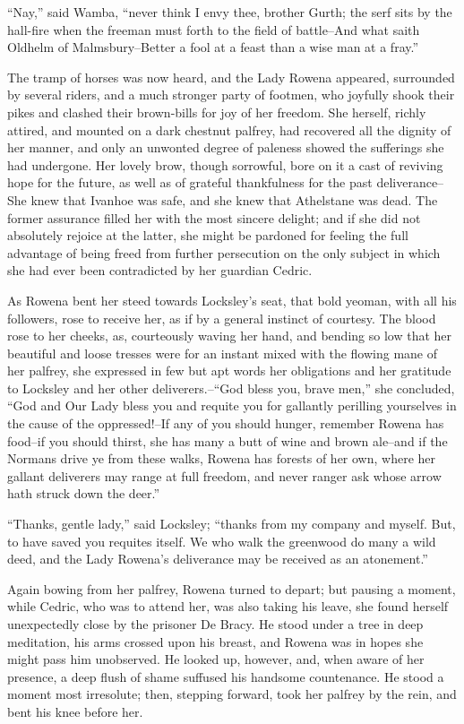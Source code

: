 ``Nay,'' said Wamba, ``never think I envy thee, brother Gurth; the serf
sits by the hall-fire when the freeman must forth to the field of
battle--And what saith Oldhelm of Malmsbury--Better a fool at a feast
than a wise man at a fray.''

The tramp of horses was now heard, and the Lady Rowena appeared,
surrounded by several riders, and a much stronger party of footmen, who
joyfully shook their pikes and clashed their brown-bills for joy of her
freedom. She herself, richly attired, and mounted on a dark chestnut
palfrey, had recovered all the dignity of her manner, and only an
unwonted degree of paleness showed the sufferings she had undergone. Her
lovely brow, though sorrowful, bore on it a cast of reviving hope for
the future, as well as of grateful thankfulness for the past
deliverance--She knew that Ivanhoe was safe, and she knew that
Athelstane was dead. The former assurance filled her with the most
sincere delight; and if she did not absolutely rejoice at the latter,
she might be pardoned for feeling the full advantage of being freed from
further persecution on the only subject in which she had ever been
contradicted by her guardian Cedric.

As Rowena bent her steed towards Locksley's seat, that bold yeoman, with
all his followers, rose to receive her, as if by a general instinct of
courtesy. The blood rose to her cheeks, as, courteously waving her hand,
and bending so low that her beautiful and loose tresses were for an
instant mixed with the flowing mane of her palfrey, she expressed in few
but apt words her obligations and her gratitude to Locksley and her
other deliverers.--``God bless you, brave men,'' she concluded, ``God
and Our Lady bless you and requite you for gallantly perilling
yourselves in the cause of the oppressed!--If any of you should hunger,
remember Rowena has food--if you should thirst, she has many a butt of
wine and brown ale--and if the Normans drive ye from these walks, Rowena
has forests of her own, where her gallant deliverers may range at full
freedom, and never ranger ask whose arrow hath struck down the deer.''

``Thanks, gentle lady,'' said Locksley; ``thanks from my company and
myself. But, to have saved you requites itself. We who walk the
greenwood do many a wild deed, and the Lady Rowena's deliverance may be
received as an atonement.''

Again bowing from her palfrey, Rowena turned to depart; but pausing a
moment, while Cedric, who was to attend her, was also taking his leave,
she found herself unexpectedly close by the prisoner De Bracy. He stood
under a tree in deep meditation, his arms crossed upon his breast, and
Rowena was in hopes she might pass him unobserved. He looked up,
however, and, when aware of her presence, a deep flush of shame suffused
his handsome countenance. He stood a moment most irresolute; then,
stepping forward, took her palfrey by the rein, and bent his knee before
her.

